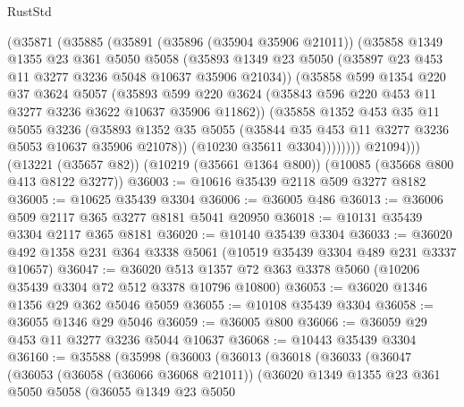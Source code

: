 \begin{lexlean}{RustStd}
\begin{coremodule}
            (@35871
              (@35885
                (@35891
                  (@35896 (@35904 @35906 @21011))
                  (@35858
                    @1349
                    @1355
                    @23
                    @361
                    @5050
                    @5058
                    (@35893
                      @1349
                      @23
                      @5050
                      (@35897 @23 @453 @11 @3277 @3236 @5048 @10637 @35906 @21034))
                    (@35858
                      @599
                      @1354
                      @220
                      @37
                      @3624
                      @5057
                      (@35893
                        @599
                        @220
                        @3624
                        (@35843 @596 @220 @453 @11 @3277 @3236 @3622 @10637 @35906 @11862))
                      (@35858
                        @1352
                        @453
                        @35
                        @11
                        @5055
                        @3236
                        (@35893
                          @1352
                          @35
                          @5055
                          (@35844 @35 @453 @11 @3277 @3236 @5053 @10637 @35906 @21078))
                        (@10230 @35611 @3304))))))))
          @21094)))
    (@13221 (@35657 @82))
    (@10219 (@35661 @1364 @800))
    (@10085 (@35668 @800 @413 @8122 @3277))
@36003 := @10616 @35439 @2118 @509 @3277 @8182
@36005 := @10625 @35439 @3304
@36006 := @36005 @486
@36013 := @36006 @509 @2117 @365 @3277 @8181 @5041 @20950
@36018 := @10131 @35439 @3304 @2117 @365 @8181
@36020 := @10140 @35439 @3304
@36033 := @36020 @492 @1358 @231 @364 @3338 @5061 (@10519 @35439 @3304 @489 @231 @3337 @10657)
@36047 := @36020 @513 @1357 @72 @363 @3378 @5060 (@10206 @35439 @3304 @72 @512 @3378 @10796 @10800)
@36053 := @36020 @1346 @1356 @29 @362 @5046 @5059
@36055 := @10108 @35439 @3304
@36058 := @36055 @1346 @29 @5046
@36059 := @36005 @800
@36066 := @36059 @29 @453 @11 @3277 @3236 @5044 @10637
@36068 := @10443 @35439 @3304
@36160 := @35588
    (@35998
      (@36003
        (@36013
          (@36018
            (@36033
              (@36047
                (@36053
                  (@36058 (@36066 @36068 @21011))
                  (@36020
                    @1349
                    @1355
                    @23
                    @361
                    @5050
                    @5058
                    (@36055
                      @1349
                      @23
                      @5050

\end{coremodule}
\end{lexlean}
